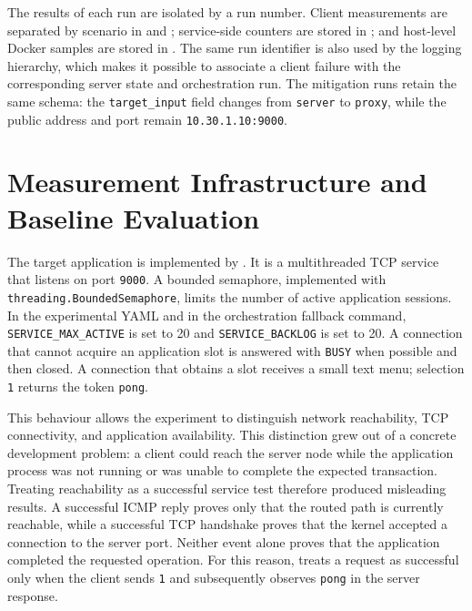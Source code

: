 The results of each run are isolated by a run number. Client
measurements are separated by scenario in
 and
; service-side counters are stored in
; and host-level Docker samples are stored in
. The same run identifier is also
used by the logging hierarchy, which makes it possible to associate a client
failure with the corresponding server state and orchestration run. The
mitigation runs retain the same schema: the \texttt{target\_input} field changes
from \texttt{server} to \texttt{proxy}, while the public address and port remain
\texttt{10.30.1.10:9000}.

\section{Measurement Infrastructure and Baseline Evaluation}
\label{sec:measurement-baseline}

The target application is implemented by . It
is a multithreaded TCP service that listens on port \texttt{9000}. A bounded
semaphore, implemented with
\texttt{threading.}\allowbreak\texttt{BoundedSemaphore}, limits the number of
active application sessions. In the experimental YAML and in the orchestration
fallback command, \texttt{SERVICE\_MAX\_ACTIVE} is set to 20 and
\texttt{SERVICE\_BACKLOG} is set to 20. A connection that cannot acquire an
application slot is answered with \texttt{BUSY} when possible and then closed.
A connection that obtains a slot receives a small text menu; selection
\texttt{1} returns the token \texttt{pong}.

This behaviour allows the experiment to distinguish network reachability, TCP
connectivity, and application availability. This distinction grew out of a
concrete development problem: a client could reach the server node while the
application process was not running or was unable to complete the expected
transaction. Treating reachability as a successful service test therefore
produced misleading results. A successful ICMP reply proves only that the
routed path is currently reachable, while a successful TCP handshake proves
that the kernel accepted a connection to the server port. Neither event alone
proves that the application completed the requested operation. For this reason,
 treats a request as successful only when the
client sends \texttt{1} and subsequently observes \texttt{pong} in the server
response.

